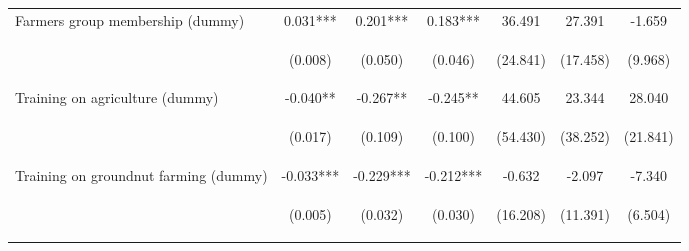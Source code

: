 \begin{center}
\begin{tabular}{lcccccc}
Farmers group membership (dummy) & 0.031*** & 0.201*** & 0.183*** & 36.491 & 27.391 & -1.659 \\
\vspace{4pt} & \begin{footnotesize}(0.008)\end{footnotesize} & \begin{footnotesize}(0.050)\end{footnotesize} & \begin{footnotesize}(0.046)\end{footnotesize} & \begin{footnotesize}(24.841)\end{footnotesize} & \begin{footnotesize}(17.458)\end{footnotesize} & \begin{footnotesize}(9.968)\end{footnotesize} \\
Training on agriculture (dummy) & -0.040** & -0.267** & -0.245** & 44.605 & 23.344 & 28.040 \\
\vspace{4pt} & \begin{footnotesize}(0.017)\end{footnotesize} & \begin{footnotesize}(0.109)\end{footnotesize} & \begin{footnotesize}(0.100)\end{footnotesize} & \begin{footnotesize}(54.430)\end{footnotesize} & \begin{footnotesize}(38.252)\end{footnotesize} & \begin{footnotesize}(21.841)\end{footnotesize} \\
Training on groundnut farming (dummy) & -0.033*** & -0.229*** & -0.212*** & -0.632 & -2.097 & -7.340 \\
\vspace{4pt} & \begin{footnotesize}(0.005)\end{footnotesize} & \begin{footnotesize}(0.032)\end{footnotesize} & \begin{footnotesize}(0.030)\end{footnotesize} & \begin{footnotesize}(16.208)\end{footnotesize} & \begin{footnotesize}(11.391)\end{footnotesize} & \begin{footnotesize}(6.504)\end{footnotesize} \\

\end{tabular}
\end{center}
